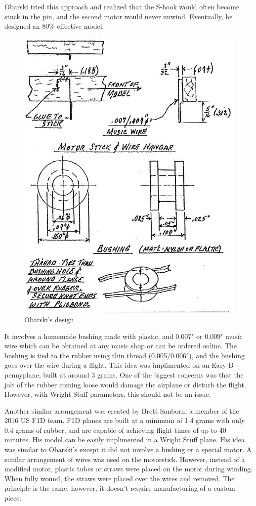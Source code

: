 \documentclass[12pt]{article}
\begin{document}
Obarski tried this approach and realized that the S-hook would often become stuck in the pin, and the second motor would never unwind. Eventually, he designed an 80\% effective model. 
\begin{figure}[h]
\caption{Obarski's design}
\centering
\includegraphics[scale=0.6]{"drawings"}
\end{figure}

It involves a homemade bushing made with plastic, and 0.007" or 0.009" music wire which can be obtained at any music shop or can be ordered online. The bushing is tied to the rubber using thin thread (0.005/0.006"), and the bushing goes over the wire during a flight. This idea was implimented on an Easy-B pennyplane, built at around 3 grams. One of the biggest concerns was that the jolt of the rubber coming loose would damage the airplane or disturb the flight. However, with Wright Stuff parameters, this should not be an issue. 

Another similar arrangement was created by Brett Sanborn, a member of the 2016 US F1D team. F1D planes are built at a minimum of 1.4 grams with only 0.4 grams of rubber, and are capable of achieving flight times of up to 40 minutes. His model can be easily implimented in a Wright Stuff plane. His idea was similar to Obarski's except it did not involve a bushing or a special motor. A similar arrangement of wires was used on the motorstick. However, instead of a modified motor, plastic tubes or straws were placed on the motor during winding. When fully wound, the straws were placed over the wires and removed. The principle is the same, however, it doesn't require manufacturing of a custom piece. 
\end{document}
